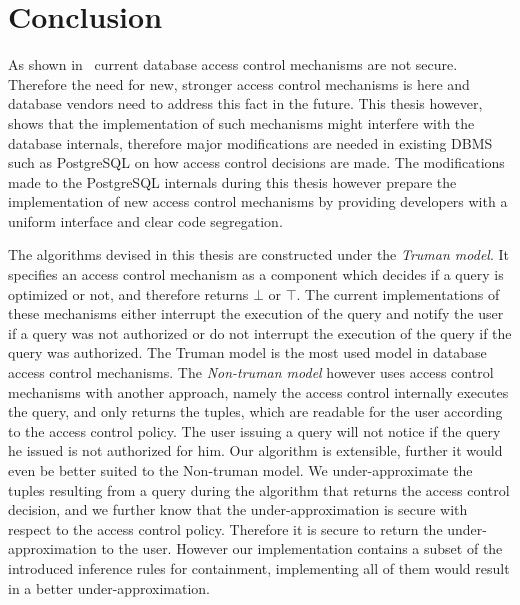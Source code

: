 \section{Conclusion}

As shown in~\cite{guarnieri2016strong} current database access control mechanisms are not secure.
%
Therefore the need for new, stronger access control mechanisms is here and database vendors need to address this fact in the future.
%
This thesis however, shows that the implementation of such mechanisms might interfere with the database internals, therefore major modifications are needed in existing DBMS such as PostgreSQL on how access control decisions are made.
%
The modifications made to the PostgreSQL internals during this thesis however prepare the implementation of new access control mechanisms by providing developers with a uniform interface and clear code segregation.

The algorithms devised in this thesis are constructed under the \emph{Truman model}.
%
It specifies an access control mechanism as a component which decides if a query is optimized or not, and therefore returns $\bot$ or $\top$.
%
The current implementations of these mechanisms either interrupt the execution of the query and notify the user if a query was not authorized or do not interrupt the execution of the query if the query was authorized.
%
The Truman model is the most used model in database access control mechanisms.
%
The \emph{Non-truman model} however uses access control mechanisms with another approach, namely the access control internally executes the query, and only returns the tuples, which are readable for the user according to the access control policy.
%
The user issuing a query will not notice if the query he issued is not authorized for him.
%
Our algorithm is extensible, further it would even be better suited to the Non-truman model.
%
We under-approximate the tuples resulting from a query during the algorithm that returns the access control decision, and we further know that the under-approximation is secure with respect to the access control policy.
%
Therefore it is secure to return the under-approximation to the user.
%
However our implementation contains a subset of the introduced inference rules for containment, implementing all of them would result in a better under-approximation.
